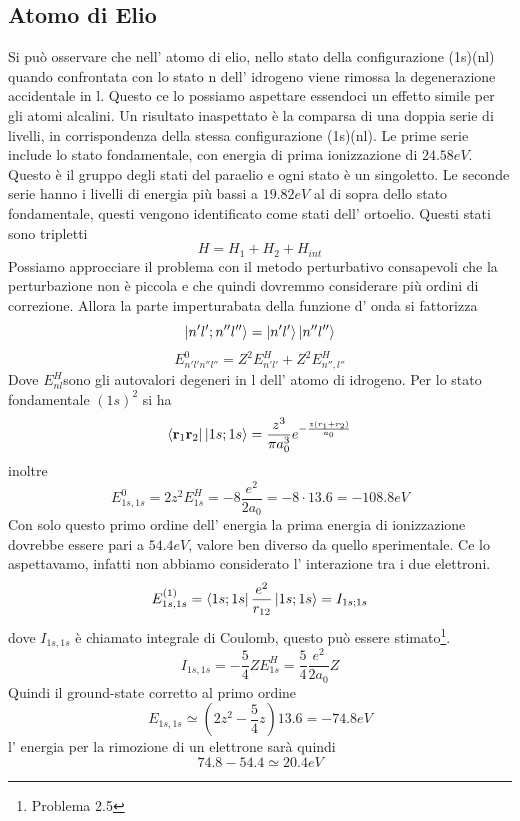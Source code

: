 \documentclass[11pt,a4paper]{article}
\theoremstyle{springer}
\theoremstyle{definition}
\theoremstyle{remark}
\begin{document}
\subsection{Atomo di Elio}
Si può osservare che nell' atomo di elio, nello stato della configurazione (1s)(nl) quando confrontata con lo stato n dell' idrogeno viene rimossa la degenerazione accidentale in l. Questo ce lo possiamo aspettare essendoci un effetto simile per gli atomi alcalini. Un risultato inaspettato è la comparsa di una doppia serie di livelli, in corrispondenza della stessa configurazione (1s)(nl). Le prime serie include lo stato fondamentale, con energia di prima ionizzazione di $24.58 eV$. Questo è il gruppo degli stati del paraelio e ogni stato è un singoletto. Le seconde serie hanno i livelli di energia più bassi a $19.82 eV$ al di sopra dello stato fondamentale, questi vengono identificato come stati dell' ortoelio. Questi stati sono tripletti
\begin{equation*}
  H = H_1 + H_2 + H_{int}
\end{equation*}
Possiamo approcciare il problema con il metodo perturbativo consapevoli che la perturbazione non è piccola e che quindi dovremmo considerare più ordini di correzione. Allora la parte imperturabata della funzione d' onda si fattorizza
\begin{equation*}
  \ket{n'l';n''l''} = \ket{n'l'}\ket{n''l''}
\end{equation*}
\begin{equation*}
  E^0_{n'l'n''l''} = Z^2 E^H_{n'l'}+ Z^2 E_{n'',l''}^{H}
\end{equation*}
Dove $E^H_{nl} $sono gli autovalori degeneri in l dell' atomo di idrogeno. Per lo stato fondamentale $(1s)^2$ si ha
\begin{equation*}
  \bra{\mathbf{r}_1\mathbf{r}_2}\ket{1s;1s} = \frac{z^3}{\pi a_0^3} e^{-\frac{z(r_1+r_2)}{a_0}}
\end{equation*}
inoltre 
\begin{equation*}
  E_{1s,1s}^{0} = 2z^2E_{1s}^H = -8 \frac{e^2}{2 a_0} = -8 \cdot 13.6 = -108.8eV
\end{equation*}
Con solo questo primo ordine dell' energia la prima energia di ionizzazione dovrebbe essere pari a $54.4 eV$, valore ben diverso da quello sperimentale. Ce lo aspettavamo, infatti non abbiamo considerato l' interazione tra i due elettroni.
\begin{equation*}
  E_{1s,1s}^{(1)} = \bra{1s;1s} \frac{e^2}{r_{12}}\ket{1s;1s} = I_{1s;1s}
\end{equation*}
dove $I_{1s,1s}$ è chiamato integrale di Coulomb, questo può essere stimato\footnote{Problema 2.5}.
\begin{equation*}
  I_{1s,1s} = -\frac{5}{4}Z E_{1s}^{H} = \frac{5}{4}\frac{e^2}{2a_0}Z 
\end{equation*} 
Quindi il ground-state corretto al primo ordine
\begin{equation*}
  E_{1s,1s} \simeq \left(2z^2-\frac{5}{4}z\right)13.6 = -74.8 eV
\end{equation*}
l' energia per la rimozione di un elettrone sarà quindi 
\begin{equation*}
  74.8 -54.4 \simeq 20.4 eV
\end{equation*}
\end{document}
